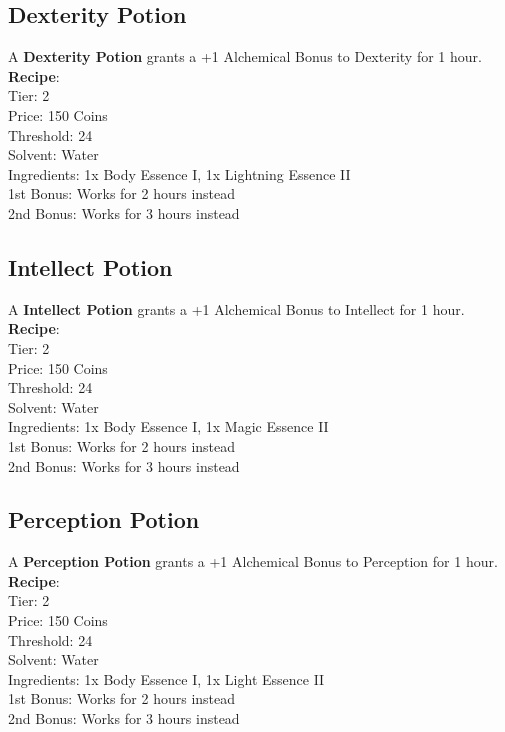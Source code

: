 \subsection{Dexterity Potion}\label{potion:dexterityPotion}
A \textbf{Dexterity Potion} grants a +1 Alchemical Bonus to Dexterity for 1 hour.\\
\textbf{Recipe}:\\
Tier: 2\\
Price: 150 Coins\\
Threshold: 24\\
Solvent: Water\\
Ingredients: 1x Body Essence I, 1x Lightning Essence II\\
1st Bonus: Works for 2 hours instead\\
2nd Bonus: Works for 3 hours instead\\

\subsection{Intellect Potion}\label{potion:intellectPotion}
A \textbf{Intellect Potion} grants a +1 Alchemical Bonus to Intellect for 1 hour.\\
\textbf{Recipe}:\\
Tier: 2\\
Price: 150 Coins\\
Threshold: 24\\
Solvent: Water\\
Ingredients: 1x Body Essence I, 1x Magic Essence II\\
1st Bonus: Works for 2 hours instead\\
2nd Bonus: Works for 3 hours instead\\

\subsection{Perception Potion}\label{potion:perceptionPotion}
A \textbf{Perception Potion} grants a +1 Alchemical Bonus to Perception for 1 hour.\\
\textbf{Recipe}:\\
Tier: 2\\
Price: 150 Coins\\
Threshold: 24\\
Solvent: Water\\
Ingredients: 1x Body Essence I, 1x Light Essence II\\
1st Bonus: Works for 2 hours instead\\
2nd Bonus: Works for 3 hours instead\\

